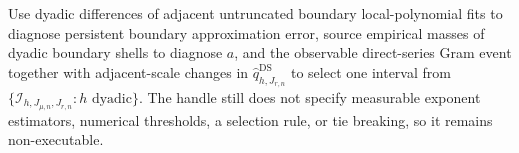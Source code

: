 Use dyadic differences of adjacent untruncated boundary local-polynomial fits to diagnose persistent boundary approximation error, source empirical masses of dyadic boundary shells to diagnose \(a\), and the observable direct-series Gram event together with adjacent-scale changes in \(\widehat q^{\mathrm{DS}}_{h,J_{r,n}}\) to select one interval from \(\{\mathcal I_{h,J_{\mu,n},J_{r,n}}:h\text{ dyadic}\}\).  The handle still does not specify measurable exponent estimators, numerical thresholds, a selection rule, or tie breaking, so it remains non-executable.